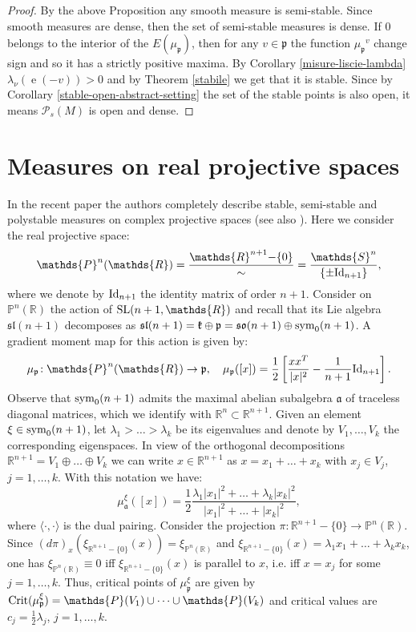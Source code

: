 \documentclass[leqno,11pt, a4]{amsart}
\theoremstyle{named}
\begin{document}
\begin{proof}
By the above Proposition any smooth measure is semi-stable. Since smooth measures are
dense, then the set of semi-stable measures is dense. If $0$ belongs to the interior of the $E({\mu_{\mathfrak{p}}})$, then for any $v\in {\mathfrak{p}}$ the function ${\mu_{\mathfrak{p}}}^v$ change sign and so it has a strictly positive maxima.
By Corollary   \ref{misure-liscie-lambda} ${\lambda}_\nu ( {\operatorname{e}}(-v))>0$ and  by Theorem \ref{stabile} we get that it is stable. Since by Corollary \ref{stable-open-abstract-setting} the set of the stable points is also open, it means ${\mathscr{P}}_s (M)$ is open and dense.
\end{proof}
\section{Measures on real projective spaces}\label{misure-proiettivo}

In the recent paper \cite{bgs} the authors completely describe stable, semi-stable and polystable measures on  complex projective spaces (see also \cite{donaldson-numerical-results,millson-zombro}).
Here we consider the real projective space:
$$
\mathds{P}^n(\mathds{R})=\frac{\mathds{R}^{n+1}{-} \{0\}}{\sim}=\frac{\mathds{S}^n}{\{\pm {\rm Id}_{n+1}\}},
$$
where we denote by ${\rm Id}_{n+1}$ the identity matrix of order $n+1$. Consider on $\mathds{P}^n(\mathds{R})$ the action of ${\rm SL}(n+1,\mathds{R})$  and recall that its Lie algebra $\mathfrak{sl}(n+1)$ decomposes as $\mathfrak{sl}(n+1)=\mathfrak{k}\oplus\mathfrak{p}=\mathfrak{so}(n+1)\oplus{\rm sym}_0(n+1)$.
A gradient moment map for this action is given by:
$$
\mu_{\mathfrak p}\!:\mathds{P}^n(\mathds{R})\rightarrow \mathfrak p,\quad \mu_{\mathfrak p}([x])=\frac12\left[\frac{xx^T}{|x|^2}-\frac1{n+1}{\rm Id}_{n+1}\right].
$$
Observe that ${\rm sym}_0(n+1)$ admits the maximal abelian subalgebra $\mathfrak a$ of traceless diagonal matrices, which we identify with $\mathds{R}^n\subset \mathds{R}^{n+1}$. Given an element $\xi\in {\rm sym}_0(n+1)$, let $\lambda_1>\dots> \lambda_k$ be its eigenvalues and denote by $V_1,\dots, V_k$ the corresponding eigenspaces.  In view of the orthogonal decompositions $\mathds{R}^{n+1}=V_1\oplus\dots\oplus V_{k}$ we can write $x\in \mathds{R}^{n+1}$ as $x=x_1+\dots+x_k$ with $x_j\in V_j$, $j=1,\dots, k$. With this notation we have:
$$
\mu_{\mathfrak a}^\xi([x])=\frac12\frac{\lambda_1|x_1|^2+\dots+\lambda_{k}|x_{k}|^2}{|x_1|^2+\dots+|x_k|^2},
$$
where $\langle\cdot,\cdot\rangle$ is the dual pairing. Consider the projection $\pi\!: \mathds{R}^{n+1}{-}\{0\}\rightarrow \mathds{P}^n(\mathds{R})$. Since $(d\pi)_x\left(\xi_{\mathds{R}^{n+1}{-}\{0\}}(x)\right)=\xi_{\mathds{P}^n(\mathds{R})}$ and $\xi_{\mathds{R}^{n+1}{-}\{0\}}(x)=\lambda_1x_1+\dots+\lambda_kx_k$, one has $\xi_{\mathds{P}^n(\mathds{R})}\equiv 0$ iff $\xi_{\mathds{R}^{n+1}{-}\{0\}}(x)$ is parallel to $x$, i.e. iff $x=x_j$ for some $j=1,\dots, k$. Thus,
critical points of $\mu_{\mathfrak p}^\xi$ are given by ${\rm Crit}(\mu^\xi_{\mathfrak p})=\mathds{P}(V_1)\cup\dots\cup \mathds{P}(V_{k})$ and critical values are $c_j=\frac12\lambda_j$, $j=1,\dots, k$.
\end{document}
